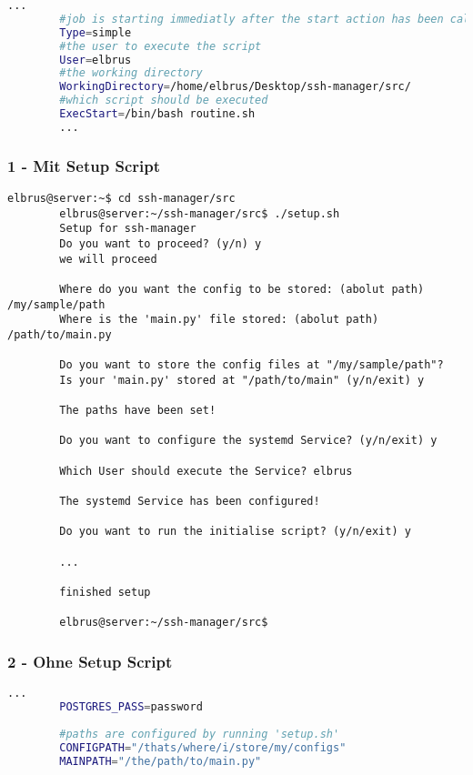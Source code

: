 \documentclass{article}
\begin{document}
	\begin{lstlisting}[caption={ssh-manager.service.example - Die Variable 'WorkingDirectory' sowie die Variable 'User' anpassen.},language=bash ,keywords={WorkingDirectory, User}, keywordstyle=\color{red}, firstnumber=5]
		...
		#job is starting immediatly after the start action has been called
		Type=simple
		#the user to execute the script
		User=elbrus
		#the working directory
		WorkingDirectory=/home/elbrus/Desktop/ssh-manager/src/
		#which script should be executed
		ExecStart=/bin/bash routine.sh
		...
	\end{lstlisting}
	\newpage
	\subsubsection{1 - Mit Setup Script}
	\lstset{style=commands}
	\begin{lstlisting}[caption={Ausführen des setup Scripts}]
		elbrus@server:~$ cd ssh-manager/src
		elbrus@server:~/ssh-manager/src$ ./setup.sh
		Setup for ssh-manager
		Do you want to proceed? (y/n) y
		we will proceed
		
		Where do you want the config to be stored: (abolut path) /my/sample/path
		Where is the 'main.py' file stored: (abolut path) /path/to/main.py
		
		Do you want to store the config files at "/my/sample/path"? 
		Is your 'main.py' stored at "/path/to/main" (y/n/exit) y
		
		The paths have been set!
		
		Do you want to configure the systemd Service? (y/n/exit) y
		
		Which User should execute the Service? elbrus
		
		The systemd Service has been configured!
		
		Do you want to run the initialise script? (y/n/exit) y
		
		...
		
		finished setup
		
		elbrus@server:~/ssh-manager/src$
	\end{lstlisting}
	
	\subsubsection{2 - Ohne Setup Script}
	\lstset{style=files}
	\begin{lstlisting}[caption={.env - Die Variable 'CONFIGPATH' sowie die Variable 'MAINPATH' anpassen.}, language=bash, keywords={CONFIGPATH, MAINPATH}, keywordstyle=\color{red}, firstnumber=17]
		...
		POSTGRES_PASS=password
		
		#paths are configured by running 'setup.sh'
		CONFIGPATH="/thats/where/i/store/my/configs"
		MAINPATH="/the/path/to/main.py"
	\end{lstlisting}
\end{document}
